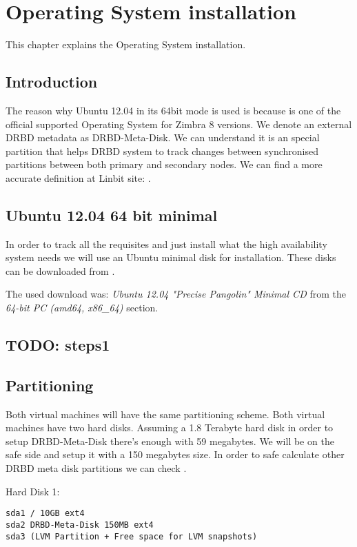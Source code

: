 

\chapter{Operating System installation}
\label{chap:operating-system-installation}
This chapter explains the Operating System installation.

\section {Introduction}
The reason why Ubuntu 12.04 in its 64bit mode is used is because is one of the official supported Operating System for Zimbra 8 versions. We denote an external DRBD metadata as DRBD-Meta-Disk. We can understand it is an special partition that helps DRBD system to track changes between synchronised partitions between both primary and secondary nodes. We can find a more accurate definition at Linbit site: \cite{LinbitDRBDInternals}.

\section {Ubuntu 12.04 64 bit minimal}
In order to track all the requisites and just install what the high availability system needs we will use an Ubuntu minimal disk for installation. These disks can be downloaded from \cite{UbuntuMinimalDisk}.

The used download was: \textit{Ubuntu 12.04 "Precise Pangolin" Minimal CD} from the \textit{64-bit PC (amd64, x86\_64)} section. 

\section {TODO: steps1}
\section {Partitioning}
Both virtual machines will have the same partitioning scheme. Both virtual machines have two hard disks.
Assuming a 1.8 Terabyte hard disk in order to setup DRBD-Meta-Disk there's enough with 59 megabytes. We will be on the safe side and setup it with a 150 megabytes size. In order to safe calculate other DRBD meta disk partitions we can check \cite{LinbitDRBDInternals}.

Hard Disk 1:
\begin{verbatim}
sda1 / 10GB ext4
sda2 DRBD-Meta-Disk 150MB ext4
sda3 (LVM Partition + Free space for LVM snapshots)
\end{verbatim}

